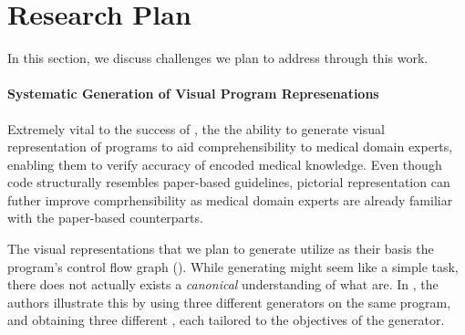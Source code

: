\section{Research Plan}

In this section, we discuss challenges we plan to address through this work.

\paragraph{Systematic Generation of Visual Program Represenations}

Extremely vital to the success of \MediK{}, the the ability
to generate visual representation of \MediK{} programs to aid
comprehensibility to medical domain experts, enabling them to verify
accuracy of encoded medical knowledge. Even though \MediK{} code
structurally resembles paper-based guidelines, pictorial
representation can futher improve comprhensibility as medical
domain experts are already familiar with the paper-based counterparts.

The visual representations that we plan to generate utilize
as their basis the program's control flow graph (\CFG).
While generating \CFGs{} might seem like a simple task,
there does not actually exists a \emph{canonical} understanding of
what \CFGs{} are. In \cite{KoppelICFP22}, the authors
illustrate this by using three different \CFG{} generators
on the same program, and obtaining three different \CFGs{}, each
tailored to the objectives of the generator.








